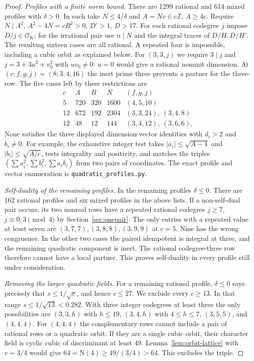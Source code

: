 \documentclass[11pt,a4paper]{article}
\numberwithin{equation}{section}
\begin{document}
\begin{proof}
\par\smallskip\noindent\emph{Profiles with a finite norm bound.}\enspace
There are 1299 rational and 614 mixed profiles with $\delta>0$.
In each take $N\le4/\delta$ and $A=Nv\in c\mathbb Z$, $A\ge4c$.
Require $N\mid A^2$, $A^2-4N=cB^2>0$, $D'>1$, $D>17$.
For each rational codegree $j$ impose $D/j\in\mathcal O_K$; for the
irrational pair use $n\mid N$ and the integral traces of $D/H,D/H'$.
The resulting sixteen cases are all rational. A repeated four is
impossible, including a cubic orbit as explained below. For
$(3,3,j)$ we require $3\mid j$ and $j=3+3u^2+v_0^2$ with
$u v_0\ne0$: $u=0$ would give a rational nonunit dimension.
At $(c;f,g,j)=(8;3,4,16)$ the inert prime three prevents a partner
for the three-row. The five cases left by these restrictions are
\[
\begin{array}{c|rrr|c}
 c&A&B&N&(f,g,j)\\\hline
 5&720&320&1600&(4,5,10)\\
 12&672&192&2304&(3,3,24),\ (3,4,8)\\
 12&48&12&144&(3,4,12),\ (3,6,6).
\end{array}
\]
None satisfies the three displayed dimension-vector identities with
$d_i>2$ and $b_i\ne0$. For example, the exhaustive integer test takes
$|a_i|\le\sqrt{A-4}$ and $|b_i|\le\sqrt{A/c}$, tests integrality and
positivity, and matches the triples
$(\sum a_i^2,\sum b_i^2,\sum a_i b_i)$ from two pairs of coordinates.
The exact profile and vector enumeration is
\texttt{quadratic\_profiles.py}.

\par\smallskip\noindent\emph{Self-duality of the remaining profiles.}\enspace
In the remaining profiles $\delta\le0$. There are 162 rational profiles
and six mixed profiles in the above lists. If a non-self-dual pair
occurs, its two nonreal rows have a repeated rational codegree
$j\ge7$, $j\equiv0,3\pmod4$ by Section~\ref{sec:onepair}.
The only entries with a repeated value at least seven are
$(3,7,7),(3,8,8),(3,9,9)$ at $c=5$. Nine has the wrong congruence.
In the other two cases the paired idempotent is integral at three,
and the remaining quadratic component is inert. The rational
codegree-three row therefore cannot have a local partner. This proves
self-duality in every profile still under consideration.

\par\smallskip\noindent\emph{Removing the larger quadratic fields.}\enspace
For a remaining rational profile, $\delta\le0$ says precisely that
$s\le1/\sqrt c$, and hence $c\le27$.
We exclude every $c\ge13$. In that range
$s\le1/\sqrt{13}<0.282$. With three integer codegrees at least
three the only possibilities are $(3,3,h)$ with $h\le19$,
$(3,4,h)$ with $4\le h\le7$, $(3,5,5)$, and $(4,4,4)$.
For $(4,4,4)$ the complementary rows cannot include a pair of rational
rows or a quadratic orbit. If they are a single cubic orbit, their
character field is cyclic cubic of discriminant at least $49$.
Lemma~\ref{lem:orbit-lattice} with $v=3/4$ would give
$64=\mathrm N(4)\ge49/(3/4)>64$. This excludes the triple.


\end{proof}
\end{document}
